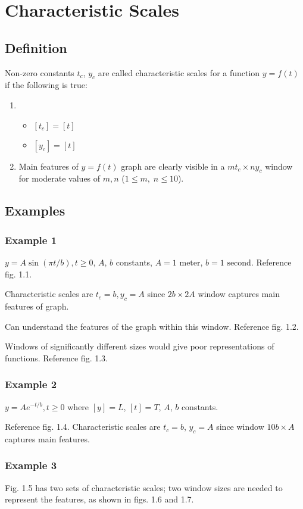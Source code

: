\documentclass[12pt,twoside]{article}
\begin{document}
\section{Characteristic Scales}
\subsection{Definition}
Non-zero constants $t_c$, $y_c$ are called characteristic scales for a function
$y=f(t)$ if the following is true:

\begin{enumerate}
\item \begin{itemize}
\item $[t_c] = [t]$
\item $[y_c] = [t]$
\end{itemize}

\item Main features of $y=f(t)$ graph are clearly visible in a $mt_c \times ny_c$
   window for moderate values of $m,n$ ($1 \le m, \; n \le 10$).
\end{enumerate}

\subsection{Examples}
\subsubsection{Example 1}
$y=A\sin(\pi t/b), t \ge 0$, $A$, $b$ constants, $A = 1 \text{ meter}$, $b=1
\text{ second}$. Reference fig. 1.1.

Characteristic scales are $t_c=b, y_c=A$ since $2b \times 2A$ window captures
main features of graph.

Can understand the features of the graph within this window. Reference fig. 1.2.

Windows of significantly different sizes would give poor representations of
functions. Reference fig. 1.3.

\subsubsection{Example 2}
$y = Ae^{-t/b}, t\ge0$ where $[y]=L$, $[t] = T$, $A$, $b$ constants.

Reference fig. 1.4. Characteristic scales are $t_c=b$, $y_c=A$ since window
$10b \times A$ captures main features.

\subsubsection{Example 3}
Fig. 1.5 has two sets of characteristic scales; two window sizes are needed to
represent the features, as shown in figs. 1.6 and 1.7.
\end{document}
